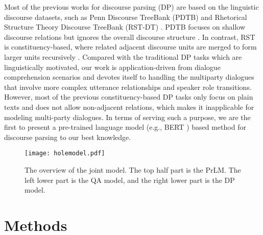 \documentclass[11pt]{article}
\begin{document}
Most of the previous works for discourse parsing (DP) are based on the linguistic discourse datasets, such as Penn Discourse TreeBank (PDTB) \cite{prasad2008penn} and Rhetorical Structure Theory Discourse TreeBank (RST-DT) \cite{mann1988rhetorical}. PDTB focuses on shallow discourse relations but ignores the overall discourse structure \cite{qin2017adversarial,cai2017pair,bai2018deep,yang2018scidtb}.
In contrast, RST is constituency-based, where related adjacent discourse units are merged to form larger units recursively \cite{braud2017cross,wang2017two,yu2018transition,joty2015codra,li2016discourse,liu2017learning}.
Compared with the traditional DP tasks which are linguistically motivated, our work is application-driven from dialogue comprehension scenarios and devotes itself to handling the multiparty dialogues that involve more complex utterance relationships and speaker role transitions. However, most of the previous constituency-based DP tasks only focus on plain texts and does not allow non-adjacent relations, which makes it inapplicable for modeling multi-party dialogues. In terms of serving such a purpose, we are the first to present a  pre-trained language model (e.g., BERT \cite{devlin-etal-2019-bert}) based method for discourse parsing to our best knowledge.













\begin{figure*}[ht]
		\centering
		\texttt{[image: holemodel.pdf]}
		\caption{\label{fig:PrLM}The overview of the joint model. The top half part is the PrLM. The left lower part is the QA model, and the right lower part is the DP model.}
\end{figure*}

\section{Methods}\label{sec:methods}
\end{document}

